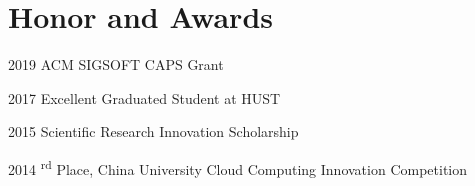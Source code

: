 \documentclass[12pt,letterpaper]{report}
\begin{document}
%		
%		
%		
%		
%		
%		
%	


\section*{Honor and Awards}

\begin{tablist}
	\item[2019] \tab ACM SIGSOFT CAPS Grant
	\item[2017] \tab Excellent Graduated Student at HUST
	\item[2015] \tab Scientific Research Innovation Scholarship
	\item[2014] \textsuperscript{rd} Place, China University Cloud Computing Innovation Competition
\end{tablist}
\end{document}
